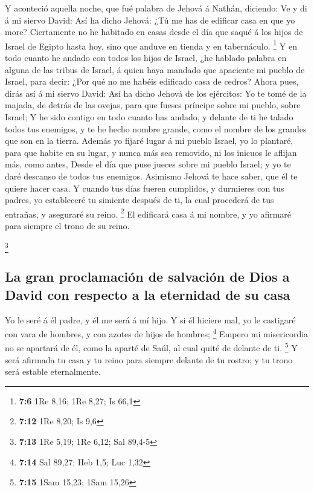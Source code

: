  Y aconteció aquella noche, que fué palabra de Jehová á
Nathán, diciendo:  Ve y di á mi siervo David: Así ha dicho
Jehová: ¿Tú me has de edificar casa en que yo more? 
Ciertamente no he habitado en casas desde el día que saqué á los hijos
de Israel de Egipto hasta hoy, sino que anduve en tienda y en
tabernáculo. \footnote{\textbf{7:6} 1Re 8,16; 1Re 8,27; Is 66,1}
 Y en todo cuanto he andado con todos los hijos de Israel,
¿he hablado palabra en alguna de las tribus de Israel, á quien haya
mandado que apaciente mi pueblo de Israel, para decir: ¿Por qué no me
habéis edificado casa de cedros?  Ahora pues, dirás así á
mi siervo David: Así ha dicho Jehová de los ejércitos: Yo te tomé de la
majada, de detrás de las ovejas, para que fueses príncipe sobre mi
pueblo, sobre Israel;  Y he sido contigo en todo cuanto
has andado, y delante de ti he talado todos tus enemigos, y te he hecho
nombre grande, como el nombre de los grandes que son en la tierra.
 Además yo fijaré lugar á mi pueblo Israel, yo lo
plantaré, para que habite en su lugar, y nunca más sea removido, ni los
inicuos le aflijan más, como antes,  Desde el día que
puse jueces sobre mi pueblo Israel; y yo te daré descanso de todos tus
enemigos. Asimismo Jehová te hace saber, que él te quiere hacer casa.
 Y cuando tus días fueren cumplidos, y durmieres con tus
padres, yo estableceré tu simiente después de ti, la cual procederá de
tus entrañas, y aseguraré su reino. \footnote{\textbf{7:12} 1Re 8,20; Is
  9,6}  El edificará casa á mi nombre, y yo afirmaré para
siempre el trono de su reino.

\footnote{\textbf{7:13} 1Re 5,19; 1Re 6,12; Sal 89,4-5}

\hypertarget{la-gran-proclamaciuxf3n-de-salvaciuxf3n-de-dios-a-david-con-respecto-a-la-eternidad-de-su-casa}{%
\subsection{La gran proclamación de salvación de Dios a David con
respecto a la eternidad de su
casa}\label{la-gran-proclamaciuxf3n-de-salvaciuxf3n-de-dios-a-david-con-respecto-a-la-eternidad-de-su-casa}}

 Yo le seré á él padre, y él me será á mí hijo. Y si él
hiciere mal, yo le castigaré con vara de hombres, y con azotes de hijos
de hombres; \footnote{\textbf{7:14} Sal 89,27; Heb 1,5; Luc 1,32}
 Empero mi misericordia no se apartará de él, como la
aparté de Saúl, al cual quité de delante de ti. \footnote{\textbf{7:15}
  1Sam 15,23; 1Sam 15,26}  Y será afirmada tu casa y tu
reino para siempre delante de tu rostro; y tu trono será estable
eternalmente.

